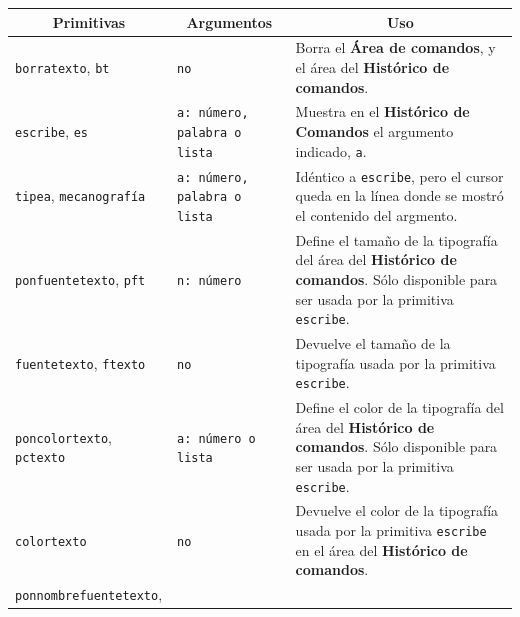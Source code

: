 \begin{center}\begin{longtable}{|m{35mm}|m{25mm}|m{9cm}|} \hline 
\multicolumn{1}{|c|}{\textbf{Primitivas}} &
   \multicolumn{1}{c|}{\textbf{Argumentos}} &
      \multicolumn{1}{c|}{\textbf{Uso}} \\ \endhead \hline
   \texttt{borratexto}, \index{borratexto@\texttt{borratexto}}
     \texttt{bt} \index{bt@\texttt{bt}} & \texttt{no} &
        Borra el \textbf{\'Area de comandos}, y el \'area del
        \textbf{Hist\'orico de comandos}. \\ \hline 
   \texttt{escribe}, \index{escribe@\texttt{escribe}}
     \texttt{es} \index{es@\texttt{es}} & 
        \texttt{a: n\'umero, palabra o lista} &
        Muestra en el \textbf{Hist\'orico de Comandos} el argumento indicado,
        \texttt{a}.\\ \hline 
   \texttt{tipea}\index{tipea@\texttt{tipea}},
      \texttt{mecanograf\'ia} \index{mecanograf\'ia@\texttt{mecanograf\'ia}}  & 
      \texttt{a: n\'umero, palabra o lista} &
        Id\'entico a \texttt{escribe}, pero el cursor queda en la l\'inea donde
        se mostr\'o el contenido del argmento. \\ \hline 
   \texttt{ponfuentetexto}, \index{ponfuentetexto@\texttt{ponfuentetexto}}
      \texttt{pft} \index{pft@\texttt{pft}} & \texttt{n: n\'umero} &
        Define el tama\~no de la tipograf\'ia del \'area del
        \textbf{Hist\'orico de comandos}. S\'olo disponible para ser usada
        por la primitiva \texttt{escribe}. \\ \hline 
   \texttt{fuentetexto}, \index{fuentetexto@\texttt{fuentetexto}}
     \texttt{ftexto} \index{ftexto@\texttt{ftexto}} & \texttt{no} &
        Devuelve el tama\~no de la tipograf\'ia usada por la primitiva
        \texttt{escribe}. \\ \hline 
   \texttt{poncolortexto}, \index{poncolortexto@\texttt{poncolortexto}}
     \texttt{pctexto} \index{pctexto@\texttt{pctexto}} & 
        \texttt{a: n\'umero o lista} &
        Define el color de la tipograf\'ia del \'area del
        \textbf{Hist\'orico de comandos}. S\'olo disponible para ser
        usada por la primitiva \texttt{escribe}.\\ \hline 
   \texttt{colortexto} \index{colortexto@\texttt{colortexto}} & \texttt{no} &
        Devuelve el color de la tipograf\'ia usada por la primitiva
        \texttt{escribe} en el \'area del \textbf{Hist\'orico de comandos}.\\ \hline
   \texttt{ponnombrefuentetexto}, 

\end{longtable}
\end{center}
